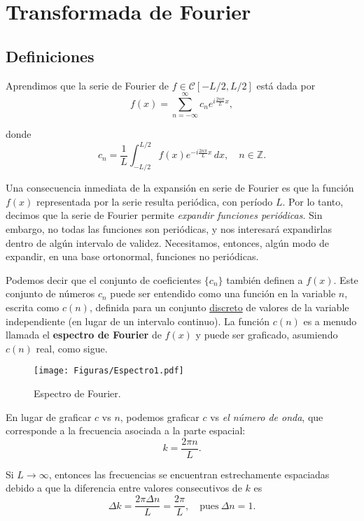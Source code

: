 \chapter{Transformada de Fourier}

\section{Definiciones}

Aprendimos que la serie de Fourier de $f \in \mathscr{C}[-L/2,L/2]$ está dada por 
\begin{equation}
  f(x) = \sum_{n=-\infty}^{\infty} c_n e^{i \frac{2n\pi}{L}x},  \label{Transformada1}
\end{equation}

donde 
\begin{equation}
  c_n = \frac{1}{L} \int_{-L/2}^{L/2} f(x) e^{-i\frac{2n\pi}{L}x} \,dx, \quad n \in \mathbb{Z}. \label{Transformada2}
\end{equation}

Una consecuencia inmediata de la expansión en serie de Fourier es que la función $f(x)$ representada por la serie resulta periódica, con período $L$. Por lo tanto, decimos que la serie de Fourier permite \emph{expandir funciones periódicas}. Sin embargo, no todas las funciones son periódicas, y nos interesará expandirlas dentro de algún intervalo de validez. Necesitamos, entonces, algún modo de expandir, en una base ortonormal, funciones no periódicas. 

Podemos decir que el conjunto de coeficientes $\{c_n\}$ también definen a $f(x)$. Este conjunto de números $c_n$ puede ser entendido como una función en la variable $n$, escrita como $c(n)$, definida para un conjunto \underline{discreto} de valores de la variable independiente (en lugar de un intervalo continuo).  La función $c(n)$ es a menudo llamada el \textbf{espectro de Fourier} de $f(x)$ y puede ser graficado, asumiendo $c(n)$ real, como sigue.

\vspace{-0.5cm}
\begin{figure}[H]
    \centering
    \texttt{[image: Figuras/Espectro1.pdf]}
    \caption{Espectro de Fourier.}
\end{figure}

En lugar de graficar $c$ vs $n$, podemos graficar $c$ vs \emph{el número de onda}, que corresponde a la frecuencia asociada a la parte espacial:
$$k = \frac{2\pi n}{L}.$$

Si $L \to \infty$, entonces las frecuencias se encuentran estrechamente espaciadas debido a que la diferencia entre valores consecutivos de $k$ es
$$\Delta k = \frac{ 2\pi \Delta n}{L}  = \frac{2\pi}{L}, \quad \mbox{pues}~ \Delta n = 1.$$


